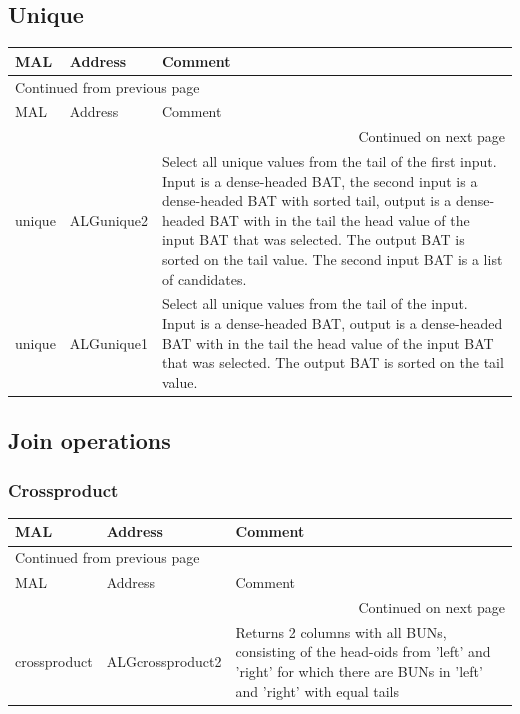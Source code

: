 \documentclass[11pt]{article}
\begin{document}
\subsection{Unique}
\label{sec:org3517f5b}
\begin{longtable}{|l|l|p{10cm}|}
\hline
MAL & Address & Comment\\
\hline
\endfirsthead
\multicolumn{3}{l}{Continued from previous page} \\
\hline

MAL & Address & Comment \\

\hline
\endhead
\hline\multicolumn{3}{r}{Continued on next page} \\
\endfoot
\endlastfoot
\hline
unique & ALGunique2 & Select all unique values from the tail of the first input. Input is a dense-headed BAT, the second input is a	dense-headed BAT with sorted tail, output is a dense-headed	BAT with in the tail the head value of the input BAT that was	selected.  The output BAT is sorted on the tail value.  The	second input BAT is a list of candidates.\\
\hline
unique & ALGunique1 & Select all unique values from the tail of the input. Input is a dense-headed BAT, output is a dense-headed BAT with	in the tail the head value of the input BAT that was selected.	The output BAT is sorted on the tail value.\\
\hline
\end{longtable}

\subsection{Join operations}
\label{sec:orgf835797}
\subsubsection{Crossproduct}
\label{sec:orgeaa36b8}
\begin{longtable}{|l|l|p{10cm}|}
\hline
MAL & Address & Comment\\
\hline
\endfirsthead
\multicolumn{3}{l}{Continued from previous page} \\
\hline

MAL & Address & Comment \\

\hline
\endhead
\hline\multicolumn{3}{r}{Continued on next page} \\
\endfoot
\endlastfoot
\hline
crossproduct & ALGcrossproduct2 & Returns 2 columns with all BUNs, consisting of the head-oids from 'left' and 'right' for which there are BUNs in 'left' and 'right' with equal tails\\
\hline
\end{longtable}
\end{document}
